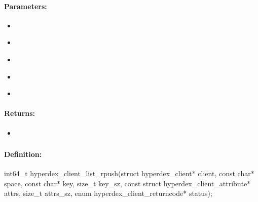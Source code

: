 \paragraph{Parameters:}
\begin{itemize}[noitemsep]
\item {}\\

\item {}\\

\item {}\\

\item {}\\

\item {}\\

\end{itemize}

\paragraph{Returns:}
\begin{itemize}[noitemsep]
\item {}\\

\end{itemize}

\pagebreak
\subsubsection{}
\label{api:c:list_rpush}


\paragraph{Definition:}
\begin{ccode}
int64_t hyperdex_client_list_rpush(struct hyperdex_client* client,
        const char* space,
        const char* key, size_t key_sz,
        const struct hyperdex_client_attribute* attrs, size_t attrs_sz,
        enum hyperdex_client_returncode* status);
\end{ccode}

